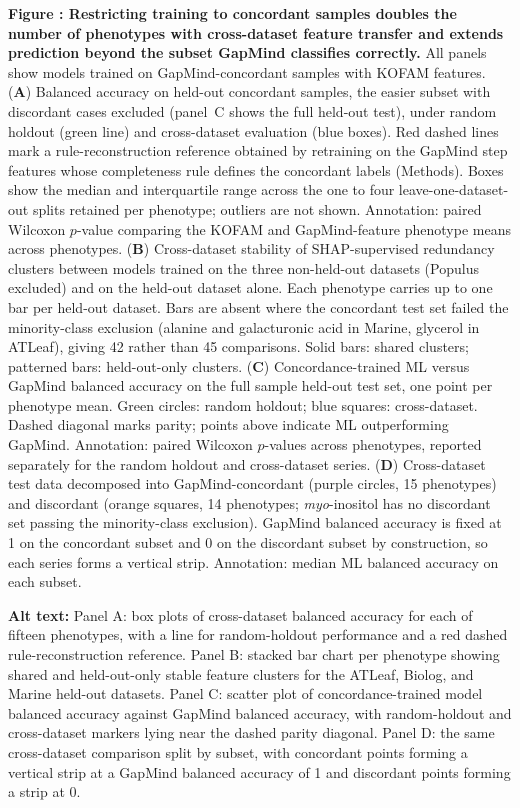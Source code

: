 \label{fig:concordant_analysis}%
\noindent\textbf{Figure : Restricting training to concordant samples doubles the number of phenotypes with cross-dataset feature transfer and extends prediction beyond the subset GapMind classifies correctly.}
All panels show models trained on GapMind-concordant samples with KOFAM features.
(\textbf{A}) Balanced accuracy on held-out concordant samples, the easier subset with discordant cases excluded (panel~C shows the full held-out test), under random holdout (green line) and cross-dataset evaluation (blue boxes).
Red dashed lines mark a rule-reconstruction reference obtained by retraining on the GapMind step features whose completeness rule defines the concordant labels (Methods).
Boxes show the median and interquartile range across the one to four leave-one-dataset-out splits retained per phenotype; outliers are not shown.
Annotation: paired Wilcoxon $p$-value comparing the KOFAM and GapMind-feature phenotype means across phenotypes.
(\textbf{B}) Cross-dataset stability of SHAP-supervised redundancy clusters between models trained on the three non-held-out datasets (Populus excluded) and on the held-out dataset alone.
Each phenotype carries up to one bar per held-out dataset.
Bars are absent where the concordant test set failed the minority-class exclusion (alanine and galacturonic acid in Marine, glycerol in ATLeaf), giving 42 rather than 45 comparisons.
Solid bars: shared clusters; patterned bars: held-out-only clusters.
(\textbf{C}) Concordance-trained ML versus GapMind balanced accuracy on the full sample held-out test set, one point per phenotype mean.
Green circles: random holdout; blue squares: cross-dataset.
Dashed diagonal marks parity; points above indicate ML outperforming GapMind.
Annotation: paired Wilcoxon $p$-values across phenotypes, reported separately for the random holdout and cross-dataset series.
(\textbf{D}) Cross-dataset test data decomposed into GapMind-concordant (purple circles, 15 phenotypes) and discordant (orange squares, 14 phenotypes; \textit{myo}-inositol has no discordant set passing the minority-class exclusion).
GapMind balanced accuracy is fixed at 1 on the concordant subset and 0 on the discordant subset by construction, so each series forms a vertical strip.
Annotation: median ML balanced accuracy on each subset.

\noindent\textbf{Alt text:} Panel A: box plots of cross-dataset balanced accuracy for each of fifteen phenotypes, with a line for random-holdout performance and a red dashed rule-reconstruction reference. Panel B: stacked bar chart per phenotype showing shared and held-out-only stable feature clusters for the ATLeaf, Biolog, and Marine held-out datasets. Panel C: scatter plot of concordance-trained model balanced accuracy against GapMind balanced accuracy, with random-holdout and cross-dataset markers lying near the dashed parity diagonal. Panel D: the same cross-dataset comparison split by subset, with concordant points forming a vertical strip at a GapMind balanced accuracy of 1 and discordant points forming a strip at 0.
\par\medskip

